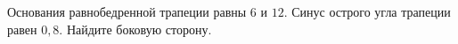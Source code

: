 \begin{ex}
	\begin{condition}
		Основания равнобедренной трапеции равны \( 6  \) и \( 12 \). Синус острого угла трапеции равен \( 0,8 \). Найдите боковую сторону.
	\end{condition}
\end{ex}